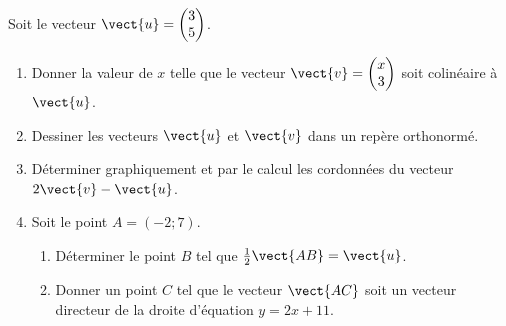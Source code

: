 
\begin{exercice}\label{exosmath-0061}

    Soit le vecteur \( \vect{ u }=\begin{pmatrix}
        3    \\ 
        5    
    \end{pmatrix}\).
    \begin{enumerate}
        \item
            Donner la valeur de \( x\) telle que le vecteur \( \vect{ v }= \begin{pmatrix}
                x    \\ 
                3    
            \end{pmatrix}\) soit colinéaire à \( \vect{ u }\).
        \item
            Dessiner les vecteurs \( \vect{ u }\) et \( \vect{ v }\) dans un repère orthonormé.
        \item
            Déterminer graphiquement et par le calcul les cordonnées du vecteur \( 2\vect{ v }-\vect{ u }\).
        \item
            Soit le point \( A=(-2;7)\). 
            \begin{enumerate}
                \item
            Déterminer le point \( B\) tel que \( \frac{ 1 }{2}\vect{ AB }=\vect{ u }\).
        \item
            Donner un point \( C\) tel que le vecteur \( \vect{ AC }\) soit un vecteur directeur de la droite d'équation \( y=2x+11\).
            \end{enumerate}
    \end{enumerate}

\end{exercice}
